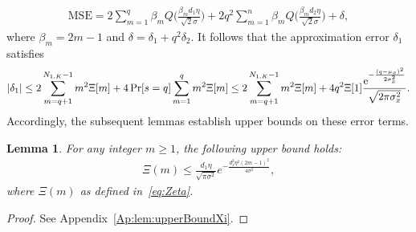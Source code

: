 \documentclass[journal,12pt,onecolumn,draftclsnofoot]{IEEEtran}
\newtheorem{lem}{Lemma}
\theoremstyle{definition}
\begin{document}
\begin{align}
\nonumber
\text{MSE}= 2\sum_{m=1}^{q}\beta_m Q\Big(\frac{\beta_m d_1 \eta }{\sqrt{2}\sigma}\Big) + 2q^2 \sum_{m=1}^{n}\beta_m  Q\Big(\frac{\beta_md_2 \eta }{\sqrt{2}\sigma}\Big) + \delta,
\end{align}
where $\beta_m = 2m - 1$ and $\delta = \delta_1 + q^2 \delta_2$.  
It follows that the approximation error $\delta_1$ satisfies
\begin{align}
\nonumber
    |\delta_1| \leq 2\sum_{m=q+1}^{N_{1,K}-1}m^2\Xi[m] + 4 \Pr[s=q] \sum_{m=1}^{q}m^2\Xi[m] 
     \leq 2\sum_{m=q+1}^{N_{1,K}-1}m^2\Xi[m] + 4q^2 \Xi[1] \frac{{\rm e}^{-\frac{(q-\mu_x)^2}{2\sigma_x^2}}}{\sqrt{2\pi \sigma_x^2}}. 
\end{align}
Accordingly, the subsequent lemmas establish upper bounds on these error terms. 
\begin{lem}\label{lem:upperBoundXi}
For any integer \(m \geq 1\), the following upper bound holds:
\begin{align}
    \Xi(m) \leq  \frac{ d_1 \eta}{\sqrt{\pi \sigma^2}} 
      e^{-\tfrac{d_1^2 \eta^2 (2m - 1)^2}{4\sigma^2}},
\end{align}
where  $\Xi(m)$ as defined in~\eqref{eq:Zeta}. 
\end{lem}
\begin{proof}
    See Appendix~\ref{Ap:lem:upperBoundXi}. 
\end{proof}
\end{document}
